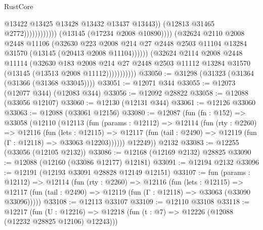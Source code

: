 \begin{lexlean}{RustCore}
\begin{coremodule}
                                                    @13422
                                                    @13425
                                                    @13428
                                                    @13432
                                                    @13437
                                                    @13443))
                                                (@12813 @31465 @2772))))))))))))
                          (@13145 (@17234 @2008 @10890))))
                      (@32624
                        @2110
                        @2008
                        @2448
                        @11106
                        (@32630
                          @223
                          @2008
                          @214
                          @27
                          @2448
                          @2503
                          @11104
                          @13284
                          @31570
                          (@13145 (@20413 @2008 @11104))))))
                  (@32624
                    @2114
                    @2008
                    @2448
                    @11114
                    (@32630
                      @183
                      @2008
                      @214
                      @27
                      @2448
                      @2503
                      @11112
                      @13284
                      @31570
                      (@13145 (@13513 @2008 @11112)))))))))))
@33050 := @31298 (@31323 (@31364 (@31366 (@31368 @33045))))
@33051 := @12071 @344
@33055 := @12073 (@12077 @344) (@12083 @344)
@33056 := @12092 @28822
@33058 := @12088 (@33056 @12107)
@33060 := @12130 (@12131 @344)
@33061 := @12126 @33060
@33063 := @12088 (@33061 @12156)
@33080 := @12087
    (fun (fn : @152) =>
    @33058
      (@12110
        (@12113
          (fun (params : @12112) =>
          @12114
            (fun (rty : @2260) =>
            @12116
              (fun (lets : @12115) =>
              @12117 (fun (tail : @2490) => @12119 (fun (Γ : @12118) => @33063 @12203))))))
        @12249))
    @2132
@33083 := @12255 (@33056 (@12105 @2132))
@33086 := @12168 (@12169 @2132) @28825
@33090 := @12088 (@12160 (@33086 @12177) @12181)
@33091 := @12194 @2132
@33096 := @12191 (@12193 @33091 @28828 @12149 @12151)
@33107 := fun (params : @12112) =>
  @12114
    (fun (rty : @2260) =>
    @12116
      (fun (lets : @12115) =>
      @12117 (fun (tail : @2490) => @12119 (fun (Γ : @12118) => @33063 (@33090 @33096)))))
@33108 := @12113 @33107
@33109 := @12110 @33108
@33118 := @12217
    (fun (U : @12216) => @12218 (fun (t : @7) => @12226 (@12088 (@12232 @28825 @12106) @12243)))

\end{coremodule}
\end{lexlean}
